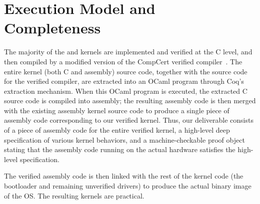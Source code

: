 

\section{Execution Model and Completeness}
The majority of the {\mCTOS} and \cCTOS{} kernels are implemented and verified 
at the C level, and then compiled by a modified version of the CompCert verified
compiler~\cite{dscal15}.  The entire kernel (both C and assembly)
source code, together with the source code for the verified compiler,
are extracted into an OCaml program through Coq's extraction
mechanism. When this OCaml program is executed, the extracted C source code 
is compiled into assembly; the resulting assembly code is then merged 
with the existing assembly kernel source code to produce a single piece 
of assembly code corresponding to our verified kernel.  Thus, our deliverable 
consists of a piece of assembly code for the entire verified kernel, a 
high-level deep specification of various kernel behaviors, and a 
machine-checkable proof object stating that the assembly code running on 
the actual hardware satisfies the high-level specification.

The verified assembly code is then linked with the rest of the kernel code
(the bootloader and remaining unverified drivers) to produce the
actual binary image of the OS. The resulting kernels are practical.

